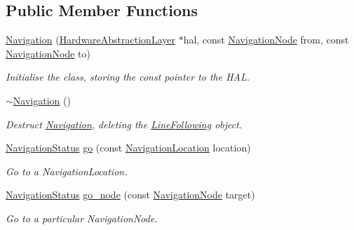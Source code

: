 \subsection*{Public Member Functions}
\begin{DoxyCompactItemize}
\item 
\hyperlink{classIDP_1_1Navigation_afc2747e51acc44614f67cb0a785f76ac}{Navigation} (\hyperlink{classIDP_1_1HardwareAbstractionLayer}{HardwareAbstractionLayer} $\ast$hal, const \hyperlink{namespaceIDP_a286f26dda01010063dff761803b4cd16}{NavigationNode} from, const \hyperlink{namespaceIDP_a286f26dda01010063dff761803b4cd16}{NavigationNode} to)
\begin{DoxyCompactList}\small\item\em Initialise the class, storing the const pointer to the HAL. \item\end{DoxyCompactList}\item 
\hyperlink{classIDP_1_1Navigation_a2af5390d05f2058beb841030f9aea0c0}{$\sim$Navigation} ()
\begin{DoxyCompactList}\small\item\em Destruct \hyperlink{classIDP_1_1Navigation}{Navigation}, deleting the \hyperlink{classIDP_1_1LineFollowing}{LineFollowing} object. \item\end{DoxyCompactList}\item 
\hyperlink{namespaceIDP_a1a96e566e4d675fdf20780cc96d92283}{NavigationStatus} \hyperlink{classIDP_1_1Navigation_aba1ab266d223b517fdc3cf6bc3d8e84c}{go} (const \hyperlink{namespaceIDP_ab9c412f0fd539b5d70385066c30465a0}{NavigationLocation} location)
\begin{DoxyCompactList}\small\item\em Go to a NavigationLocation. \item\end{DoxyCompactList}\item 
\hyperlink{namespaceIDP_a1a96e566e4d675fdf20780cc96d92283}{NavigationStatus} \hyperlink{classIDP_1_1Navigation_a24b977f20868a385251d4becf187b815}{go\_\-node} (const \hyperlink{namespaceIDP_a286f26dda01010063dff761803b4cd16}{NavigationNode} target)
\begin{DoxyCompactList}\small\item\em Go to a particular NavigationNode. \item\end{DoxyCompactList}\end{DoxyCompactItemize}


